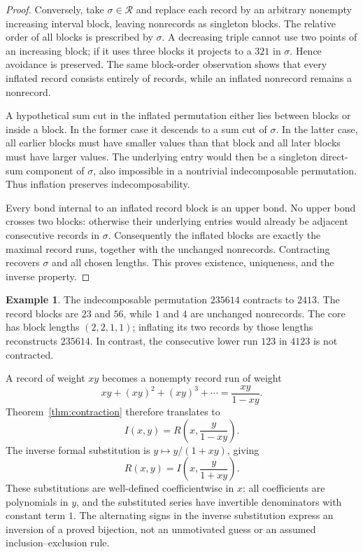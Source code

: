 \documentclass[11pt,a4paper]{article}
\theoremstyle{definition}
\newtheorem{example}[theorem]{Example}
\theoremstyle{remark}
\newcommand{\core}{\mathcal{R}}
\begin{document}
\begin{proof}
Conversely, take $\sigma\in\core$ and replace each record by an arbitrary
nonempty increasing interval block, leaving nonrecords as singleton blocks.
The relative order of all blocks is prescribed by $\sigma$. A decreasing
triple cannot use two points of an increasing block; if it uses three
blocks it projects to a $321$ in $\sigma$. Hence avoidance is preserved.
The same block-order observation shows that every inflated record consists
entirely of records, while an inflated nonrecord remains a nonrecord.

A hypothetical sum cut in the inflated permutation either lies between
blocks or inside a block. In the former case it descends to a sum cut of
$\sigma$. In the latter case, all earlier blocks must have smaller values
than that block and all later blocks must have larger values. The underlying
entry would then be a singleton direct-sum component of $\sigma$, also
impossible in a nontrivial indecomposable permutation. Thus inflation
preserves indecomposability.

Every bond internal to an inflated record block is an upper bond. No upper
bond crosses two blocks: otherwise their underlying entries would already
be adjacent consecutive records in $\sigma$. Consequently the inflated
blocks are exactly the maximal record runs, together with the unchanged
nonrecords. Contracting recovers $\sigma$ and all chosen lengths. This proves
existence, uniqueness, and the inverse property.
\end{proof}

\begin{example}
The indecomposable permutation $235614$ contracts to $2413$. The record
blocks are $23$ and $56$, while $1$ and $4$ are unchanged nonrecords.
The core has block lengths $(2,2,1,1)$; inflating its two records by those
lengths reconstructs $235614$. In contrast, the consecutive lower run
$123$ in $4123$ is not contracted.
\end{example}

A record of weight $xy$ becomes a nonempty record run of weight
\[
 xy+(xy)^2+(xy)^3+\cdots=\frac{xy}{1-xy}.
\]
Theorem~\ref{thm:contraction} therefore translates to
\begin{equation}\label{eq:inflateGF}
 I(x,y)=R\!\left(x,\frac{y}{1-xy}\right).
\end{equation}
The inverse formal substitution is $y\mapsto y/(1+xy)$, giving
\begin{equation}\label{eq:deflateGF}
 \boxed{\displaystyle R(x,y)=I\!\left(x,\frac{y}{1+xy}\right).}
\end{equation}
These substitutions are well-defined coefficientwise in $x$: all
coefficients are polynomials in $y$, and the substituted series have
invertible denominators with constant term $1$. The alternating signs in
the inverse substitution express an inversion of a proved bijection, not
an unmotivated guess or an assumed inclusion--exclusion rule.
\end{document}
